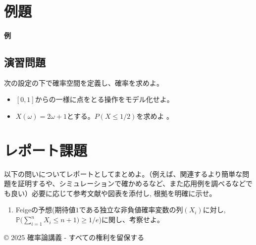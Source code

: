 \documentclass[uplatex,dvipdfmx,11pt,a4paper,openany]{bxjsbook}
\begin{document}
\section{例題}
\paragraph{例}
\subsection{演習問題}
次の設定の下で確率空間を定義し、確率を求めよ。

\begin{itemize}
\item $[0,1]$からの一様に点をとる操作をモデル化せよ。
\item $X(\omega)=2\omega+1$とする。$P(X\leq 1/2)$を求めよ 。
\end{itemize}


\section{レポート課題}
以下の問いについてレポートとしてまとめよ。（例えば、関連するより簡単な問題を証明するや、シミュレーションで確かめるなど、また応用例を調べるなどでも良い）必要に応じて参考文献や図表を添付し, 根拠を明確に示せ。

\begin{enumerate}
\item Feigeの予想(期待値$1$である独立な非負値確率変数の列$(X_i)$に対し, $\mathbb{P}\Big(\sum^n_{i=1} X_i \leq n+1\Big)\geq 1/e$)に関し、考察せよ。
\end{enumerate}

© 2025 確率論講義 - すべての権利を留保する
\end{document}
